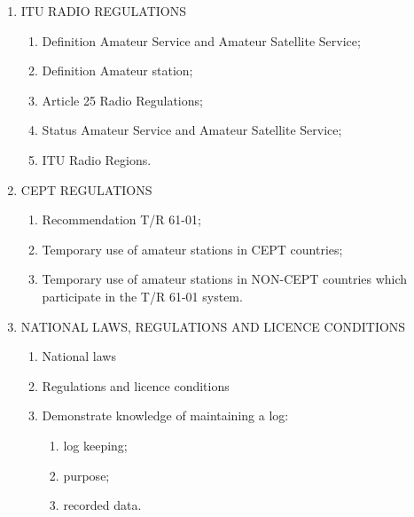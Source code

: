 \begin{enumerate}
\item ITU RADIO REGULATIONS
\begin{enumerate}
\item Definition Amateur Service and Amateur Satellite Service;
\item Definition Amateur station;
\item Article 25 Radio Regulations;
\item Status Amateur Service and Amateur Satellite Service;
\item ITU Radio Regions.
\end{enumerate}
\item CEPT REGULATIONS
\begin{enumerate}
\item Recommendation T/R 61-01;
\item Temporary use of amateur stations in CEPT countries;
\item Temporary use of amateur stations in NON-CEPT countries which participate in the T/R 61-01 system.
\end{enumerate}
\item NATIONAL LAWS, REGULATIONS AND LICENCE CONDITIONS
\begin{enumerate}
\item National laws
\item Regulations and licence conditions
\item Demonstrate knowledge of maintaining a log:
\begin{enumerate}
\item log keeping;
\item purpose;
\item recorded data.
\end{enumerate}
\end{enumerate}
\end{enumerate}

